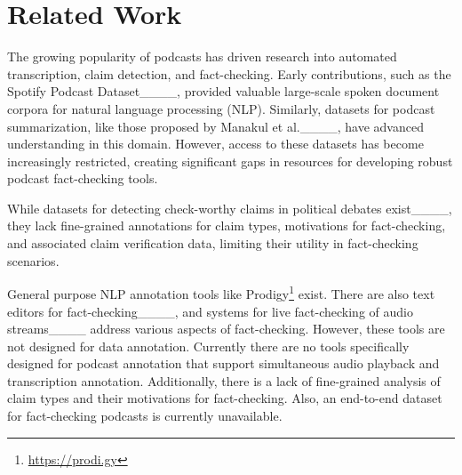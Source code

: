 \section{Related Work}
The growing popularity of podcasts has driven research into automated transcription, claim detection, and fact-checking. Early contributions, such as the Spotify Podcast Dataset____, provided valuable large-scale spoken document corpora for natural language processing (NLP). Similarly, datasets for podcast summarization, like those proposed by Manakul et al.____, have advanced understanding in this domain. However, access to these datasets has become increasingly restricted, creating significant gaps in resources for developing robust podcast fact-checking tools.

While datasets for detecting check-worthy claims in political debates exist____, they lack fine-grained annotations for claim types, motivations for fact-checking, and associated claim verification data, limiting their utility in fact-checking scenarios.

General purpose NLP annotation tools like Prodigy\footnote{\url{https://prodi.gy}} exist. There are also text editors for fact-checking____, and systems for live fact-checking of audio streams____ address various aspects of fact-checking. However, these tools are not designed for data annotation. Currently there are no tools specifically designed for podcast annotation that support simultaneous audio playback and transcription annotation. Additionally, there is a lack of fine-grained analysis of claim types and their motivations for fact-checking. Also, an end-to-end dataset for fact-checking podcasts is currently unavailable.